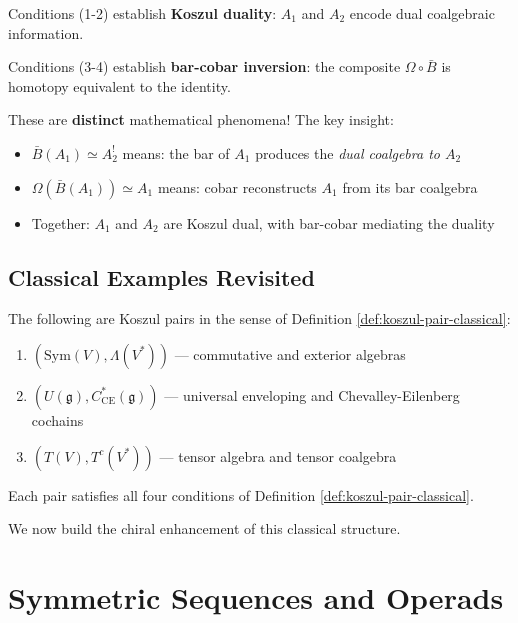 \begin{remark}
\label{rem:two-phenomena}
Conditions (1-2) establish \textbf{Koszul duality}: $A_1$ and $A_2$ encode dual coalgebraic information.

Conditions (3-4) establish \textbf{bar-cobar inversion}: the composite $\Omega \circ \bar{B}$ is homotopy equivalent to the identity.

These are \textbf{distinct} mathematical phenomena! The key insight:
\begin{itemize}
\item $\bar{B}(A_1) \simeq A_2^!$ means: the bar of $A_1$ produces the \emph{dual coalgebra to $A_2$}
\item $\Omega(\bar{B}(A_1)) \simeq A_1$ means: cobar reconstructs $A_1$ from its bar coalgebra
\item Together: $A_1$ and $A_2$ are Koszul dual, with bar-cobar mediating the duality
\end{itemize}
\end{remark}

\subsection{Classical Examples Revisited}

\begin{theorem}
The following are Koszul pairs in the sense of Definition \ref{def:koszul-pair-classical}:
\begin{enumerate}
\item $(\text{Sym}(V), \Lambda(V^*))$ — commutative and exterior algebras
\item $(U(\mathfrak{g}), C^*_{\text{CE}}(\mathfrak{g}))$ — universal enveloping and Chevalley-Eilenberg cochains
\item $(T(V), T^c(V^*))$ — tensor algebra and tensor coalgebra
\end{enumerate}
Each pair satisfies all four conditions of Definition \ref{def:koszul-pair-classical}.
\end{theorem}

We now build the chiral enhancement of this classical structure.
 
\section{Symmetric Sequences and Operads}


